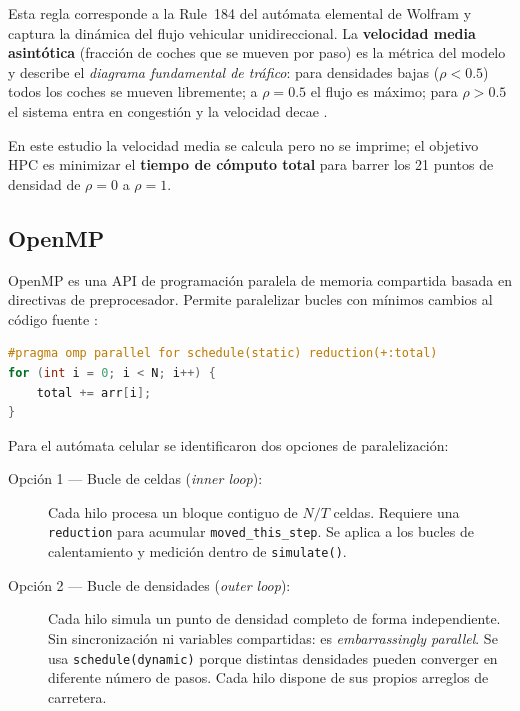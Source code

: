 \documentclass{article}
\begin{document}
Esta regla corresponde a la Rule~184 del aut\'omata elemental de Wolfram y captura la
din\'amica del flujo vehicular unidireccional. La \textbf{velocidad media asint\'otica}
(fracci\'on de coches que se mueven por paso) es la m\'etrica del modelo y describe el
\emph{diagrama fundamental de tr\'afico}: para densidades bajas ($\rho < 0.5$) todos los
coches se mueven libremente; a $\rho = 0.5$ el flujo es m\'aximo; para $\rho > 0.5$ el
sistema entra en congesti\'on y la velocidad decae \cite{nagel}.

En este estudio la velocidad media se calcula pero no se imprime; el objetivo HPC es
minimizar el \textbf{tiempo de c\'omputo total} para barrer los 21 puntos de densidad de
$\rho = 0$ a $\rho = 1$.

\subsection{OpenMP}

OpenMP es una API de programaci\'on paralela de memoria compartida basada en directivas de
preprocesador. Permite paralelizar bucles con m\'inimos cambios al c\'odigo fuente
\cite{openmp}:

\begin{lstlisting}[language=C]
#pragma omp parallel for schedule(static) reduction(+:total)
for (int i = 0; i < N; i++) {
    total += arr[i];
}
\end{lstlisting}

Para el aut\'omata celular se identificaron dos opciones de paralelizaci\'on:

\begin{description}
    \item[Opci\'on 1 --- Bucle de celdas (\emph{inner loop}):] Cada hilo procesa un
         bloque contiguo de $N/T$ celdas. Requiere una \texttt{reduction} para acumular
         \texttt{moved\_this\_step}. Se aplica a los bucles de calentamiento y medici\'on
         dentro de \texttt{simulate()}.
    \item[Opci\'on 2 --- Bucle de densidades (\emph{outer loop}):] Cada hilo simula un
         punto de densidad completo de forma independiente. Sin sincronizaci\'on ni
         variables compartidas: es \emph{embarrassingly parallel}. Se usa
         \texttt{schedule(dynamic)} porque distintas densidades pueden converger en
         diferente n\'umero de pasos. Cada hilo dispone de sus propios arreglos de
         carretera.
\end{description}
\end{document}
